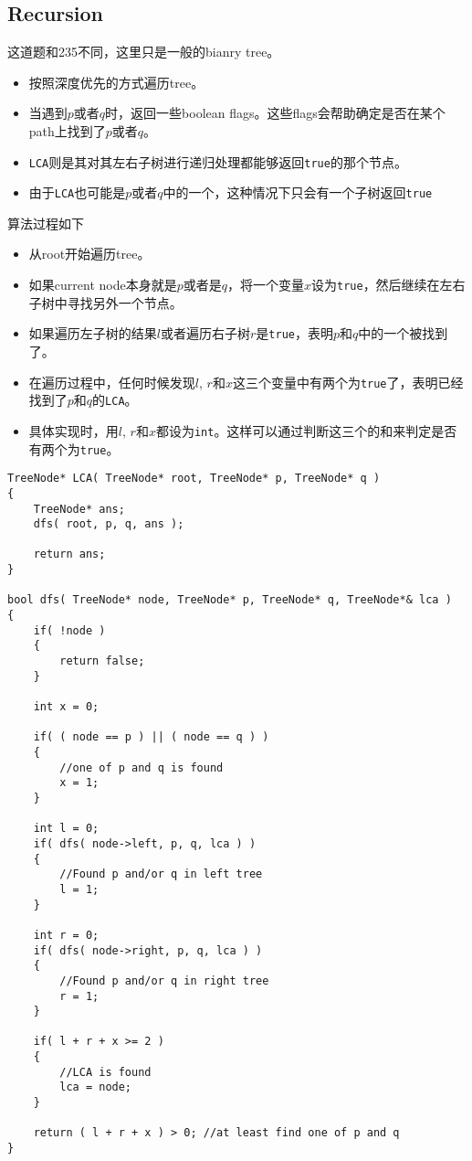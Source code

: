 \subsection{Recursion}
\begin{CJK*}{UTF8}{gbsn}
这道题和235不同，这里只是一般的bianry tree。
\begin{itemize}
\item 按照深度优先的方式遍历tree。
\item 当遇到$p$或者$q$时，返回一些boolean flags。这些flags会帮助确定是否在某个path上找到了$p$或者$q$。
\item \texttt{LCA}则是其对其左右子树进行递归处理都能够返回\texttt{true}的那个节点。
\item 由于\texttt{LCA}也可能是$p$或者$q$中的一个，这种情况下只会有一个子树返回\texttt{true}
\end{itemize}
算法过程如下
\begin{itemize}
\item 从root开始遍历tree。
\item 如果current node本身就是$p$或者是$q$，将一个变量$x$设为\texttt{true}，然后继续在左右子树中寻找另外一个节点。
\item 如果遍历左子树的结果$l$或者遍历右子树$r$是\texttt{true}，表明$p$和$q$中的一个被找到了。
\item 在遍历过程中，任何时候发现$l$, $r$和$x$这三个变量中有两个为\texttt{true}了，表明已经找到了$p$和$q$的\texttt{LCA}。
\item 具体实现时，用$l$, $r$和$x$都设为\texttt{int}。这样可以通过判断这三个的和来判定是否有两个为\texttt{true}。
\end{itemize}
\end{CJK*}
\setcounter{lstlisting}{0}
\begin{lstlisting}[style=customc, caption={Recursion}]
TreeNode* LCA( TreeNode* root, TreeNode* p, TreeNode* q )
{
    TreeNode* ans;
    dfs( root, p, q, ans );

    return ans;
}

bool dfs( TreeNode* node, TreeNode* p, TreeNode* q, TreeNode*& lca )
{
    if( !node )
    {
        return false;
    }

    int x = 0;

    if( ( node == p ) || ( node == q ) )
    {
        //one of p and q is found
        x = 1;
    }

    int l = 0;
    if( dfs( node->left, p, q, lca ) )
    {
        //Found p and/or q in left tree
        l = 1;
    }

    int r = 0;
    if( dfs( node->right, p, q, lca ) )
    {
        //Found p and/or q in right tree
        r = 1;
    }

    if( l + r + x >= 2 )
    {
        //LCA is found
        lca = node;
    }

    return ( l + r + x ) > 0; //at least find one of p and q
}
\end{lstlisting}
